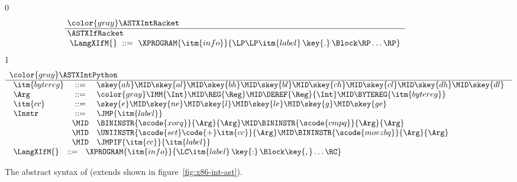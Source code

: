 \documentclass[7x10]{TimesAPriori_MIT}%
\newcommand{\gray}[1]{{\color{gray} #1}}
\def\racketEd{0}
\def\pythonEd{1}
\def\edition{1}
\newcommand{\pythonColor}[0]{}
\newcommand{\python}[1]{{\if\edition\pythonEd\pythonColor #1\fi}}
\numberwithin{theorem}{chapter}
\numberwithin{definition}{chapter}
\numberwithin{equation}{chapter}
\begin{document}
\newcommand{\ASTXIfPython}{
\begin{array}{lcl}
\itm{bytereg} &::=& \skey{ah} \MID \skey{al} \MID \skey{bh} \MID \skey{bl}
    \MID \skey{ch} \MID \skey{cl} \MID \skey{dh} \MID \skey{dl} \\
\Arg &::=&  \gray{\IMM{\Int} \MID \REG{\Reg} \MID \DEREF{\Reg}{\Int}} 
     \MID \BYTEREG{\itm{bytereg}} \\
\itm{cc} & ::= & \skey{e} \MID \skey{ne} \MID \skey{l} \MID \skey{le} \MID \skey{g} \MID \skey{ge} \\
\Instr &::=& \python{\JMP{\itm{label}}}\\
       &\MID& \BININSTR{\scode{xorq}}{\Arg}{\Arg}
       \MID \BININSTR{\scode{cmpq}}{\Arg}{\Arg}\\
       &\MID& \UNIINSTR{\scode{set}\code{+}\itm{cc}}{\Arg} 
       \MID \BININSTR{\scode{movzbq}}{\Arg}{\Arg}\\
       &\MID&  \JMPIF{\itm{cc}}{\itm{label}} 
\end{array}
}

\begin{figure}[tp]
\begin{tcolorbox}[colback=white]
\small    
{\if\edition\racketEd    
\[\arraycolsep=3pt
\begin{array}{l}
  \gray{\ASTXIntRacket} \\ \hline
  \ASTXIfRacket \\
\begin{array}{lcl}
\LangXIfM{} &::= & \XPROGRAM{\itm{info}}{\LP\LP\itm{label} \,\key{.}\, \Block \RP\ldots\RP}
\end{array}
\end{array}
\]
\fi}
%
{\if\edition\pythonEd\pythonColor
\[
\begin{array}{l}
  \gray{\ASTXIntPython} \\ \hline
  \ASTXIfPython \\
\begin{array}{lcl}
\LangXIfM{} &::= & \XPROGRAM{\itm{info}}{\LC\itm{label} \,\key{:}\, \Block \key{,} \ldots \RC }
\end{array}
\end{array}
\]
\fi}
\end{tcolorbox}
\caption{The abstract syntax of \LangXIf{} (extends \LangXInt{} shown in figure~\ref{fig:x86-int-ast}).}
\label{fig:x86-1}
\end{figure}
\end{document}
